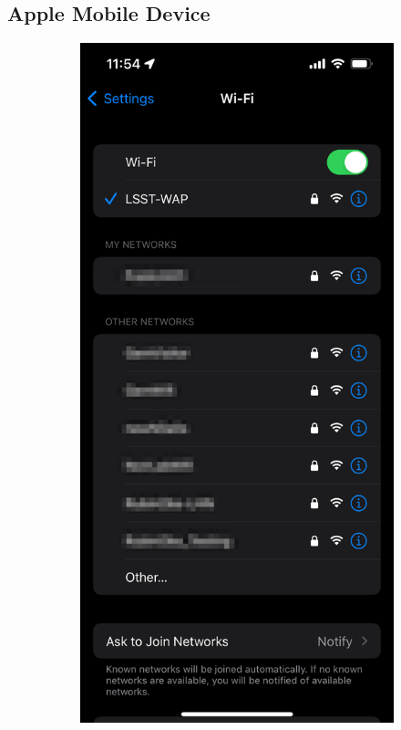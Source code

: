 \newpage
  \subsection{Apple Mobile Device}
  \vspace{20 mm}
  \begin{figure}
    \centering
    \begin{subfigure}{0.30\textwidth}
      \includegraphics[width=\textwidth]{Images/ios1.png}

\end{subfigure}
\end{figure}
